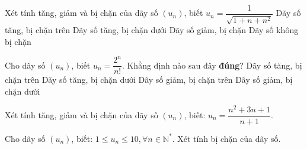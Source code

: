 \begin{ex}%
	Xét tính  tăng, giảm và bị chặn của dãy số $(u_n)$, biết $u_n=\dfrac{1}{\sqrt{1+n+n^2}}$
	 \choice
		 {Dãy số tăng, bị chặn trên}
		{Dãy số tăng,  bị chặn dưới}
		{\True  Dãy số giảm, bị chặn}
		{Dãy số không  bị chặn }
\end{ex}

\begin{ex}%
	Cho dãy số $(u_n)$, biết $u_n=\dfrac{2^n}{n!}$. Khẳng định nào  sau đây \textbf{đúng}?
	\choice 
		{Dãy số tăng, bị  chặn trên}
		{Dãy  số tăng, bị chặn dưới}
		{ \True Dãy số giảm, bị chặn trên} 
		{Dãy số giảm, bị chặn dưới} 
\end{ex}

\begin{bt}%
	Xét tính tăng, giảm và bị chặn của dãy số $(u_n)$, biết: $u_n=\dfrac{n^2+3n+1}{n+1}$. 
\end{bt}

\begin{ex}%
	Cho dãy số $(u_n)$, biết: $1 \le u_n\le 10, \forall n\in \mathbb{N}^*$. Xét tính bị chặn của dãy số. 
\end{ex}

